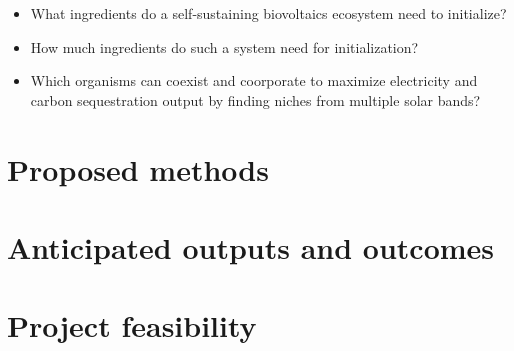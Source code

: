 \documentclass[a4paper, 11pt]{article}
\begin{document}
\begin{itemize}
	\item What ingredients do a self-sustaining biovoltaics ecosystem need to initialize?
	\item How much ingredients do such a system need for initialization?
	\item Which organisms can coexist and coorporate to maximize electricity and carbon sequestration output by finding niches from multiple solar bands?
\end{itemize}

\section{Proposed methods}

\section{Anticipated outputs and outcomes}

\section{Project feasibility}
\end{document}
